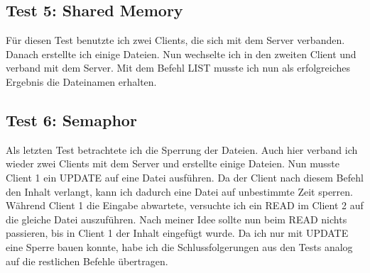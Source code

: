 \documentclass[12pt,a4paper,ngerman]{report}
\begin{document}
\subsection{Test 5: Shared Memory}
Für diesen Test benutzte ich zwei Clients, die sich mit dem Server verbanden. Danach erstellte ich einige Dateien. Nun wechselte ich in den zweiten Client und verband mit dem Server. Mit dem Befehl LIST musste ich nun als erfolgreiches Ergebnis die Dateinamen erhalten. 
\subsection{Test 6: Semaphor}
Als letzten Test betrachtete ich die Sperrung der Dateien. Auch hier verband ich wieder zwei Clients mit dem Server und erstellte einige Dateien. Nun musste Client 1 ein UPDATE auf eine Datei ausführen. Da der Client nach diesem Befehl den Inhalt verlangt, kann ich dadurch eine Datei auf unbestimmte Zeit sperren. Während Client 1 die Eingabe abwartete, versuchte ich ein READ im Client 2 auf die gleiche Datei auszuführen. Nach meiner Idee sollte nun beim READ nichts passieren, bis in Client 1 der Inhalt eingefügt wurde. Da ich nur mit UPDATE eine Sperre bauen konnte, habe ich die Schlussfolgerungen aus den Tests analog auf die restlichen Befehle übertragen.
\end{document}
